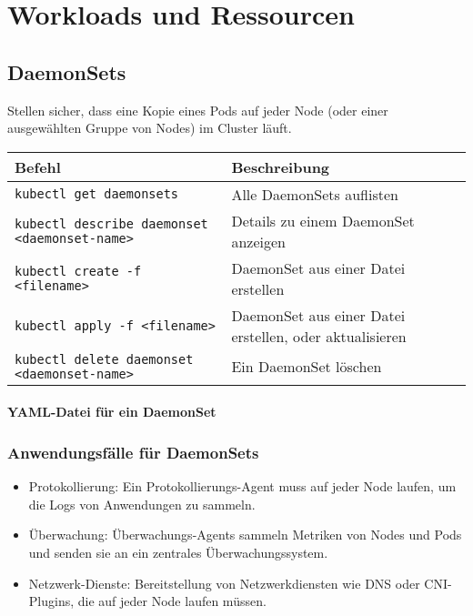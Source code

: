 \chapter{Workloads und Ressourcen}

\section{DaemonSets}
Stellen sicher, dass eine Kopie eines Pods auf jeder Node (oder einer ausgewählten Gruppe von Nodes) im Cluster läuft. \\

\noindent
\begin{tabular}{|l|l|}
\hline
\textbf{Befehl} & \textbf{Beschreibung} \\
\hline
\texttt{kubectl get daemonsets} & Alle DaemonSets auflisten \\
\texttt{kubectl describe daemonset <daemonset-name>} & Details zu einem DaemonSet anzeigen \\
\texttt{kubectl create -f <filename>} & DaemonSet aus einer Datei erstellen\\
\texttt{kubectl apply -f <filename>} & DaemonSet aus einer Datei erstellen, oder aktualisieren\\
\texttt{kubectl delete daemonset <daemonset-name>} & Ein DaemonSet löschen \\
\hline
\end{tabular}
\subsubsection{YAML-Datei für ein DaemonSet}


\subsection{Anwendungsfälle für DaemonSets}
\begin{itemize}
    \item Protokollierung: Ein Protokollierungs-Agent muss auf jeder Node laufen, um die Logs von Anwendungen zu sammeln.
    \item Überwachung: Überwachungs-Agents sammeln Metriken von Nodes und Pods und senden sie an ein zentrales Überwachungssystem.
    \item Netzwerk-Dienste: Bereitstellung von Netzwerkdiensten wie DNS oder CNI-Plugins, die auf jeder Node laufen müssen.
\end{itemize}
\newpage
